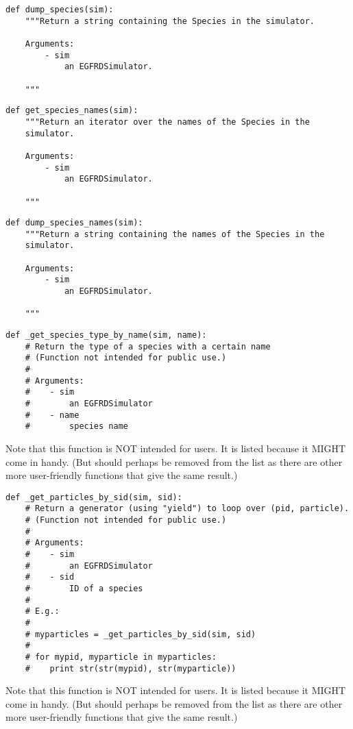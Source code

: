 \documentclass[a4paper,10pt]{article}
\begin{document}
\begin{verbatim}
def dump_species(sim):
    """Return a string containing the Species in the simulator.

    Arguments:
        - sim
            an EGFRDSimulator.

    """
\end{verbatim}

\begin{verbatim}
def get_species_names(sim):
    """Return an iterator over the names of the Species in the 
    simulator.

    Arguments:
        - sim
            an EGFRDSimulator.

    """
\end{verbatim}

\begin{verbatim}
def dump_species_names(sim):
    """Return a string containing the names of the Species in the 
    simulator.

    Arguments:
        - sim
            an EGFRDSimulator.

    """
\end{verbatim}

\begin{verbatim}
def _get_species_type_by_name(sim, name):
    # Return the type of a species with a certain name
    # (Function not intended for public use.)
    #
    # Arguments:
    #    - sim
    #        an EGFRDSimulator
    #    - name
    #        species name
\end{verbatim}
Note that this function is NOT intended for users. It is listed because it MIGHT come in handy. (But should perhaps be removed from the list as there are other more user-friendly functions that give the same result.)

\begin{verbatim}
def _get_particles_by_sid(sim, sid):
    # Return a generator (using "yield") to loop over (pid, particle).
    # (Function not intended for public use.)
    # 
    # Arguments:
    #    - sim
    #        an EGFRDSimulator
    #    - sid
    #        ID of a species
    #
    # E.g.:
    #
    # myparticles = _get_particles_by_sid(sim, sid)
    #
    # for mypid, myparticle in myparticles:
    #    print str(str(mypid), str(myparticle))
\end{verbatim}
Note that this function is NOT intended for users. It is listed because it MIGHT come in handy. (But should perhaps be removed from the list as there are other more user-friendly functions that give the same result.)
\end{document}
